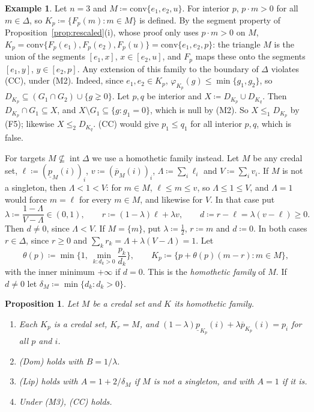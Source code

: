 \documentclass[11pt]{article}
\newtheorem{proposition}[theorem]{Proposition}
\theoremstyle{definition}
\newtheorem{example}[theorem]{Example}
\newcommand{\lp}{\underline{p}}
\newcommand{\up}{\overline{p}}
\newcommand{\gneqz}{\gneq 0}
\begin{document}
\begin{example}\label{ex:cc-fails}
Let $n=3$ and $M\coloneqq\mathrm{conv}\{e_1,e_2,u\}$. For interior $p$, $p\cdot m>0$ for all $m\in\Delta$, so $K_p\coloneqq\{F_p(m):m\in M\}$ is defined. By the segment property of Proposition~\ref{prop:rescaled}(i), whose proof only uses $p\cdot m>0$ on $M$, $K_p=\mathrm{conv}\{F_p(e_1),F_p(e_2),F_p(u)\}=\mathrm{conv}\{e_1,e_2,p\}$: the triangle $M$ is the union of the segments $[e_1,x]$, $x\in[e_2,u]$, and $F_p$ maps these onto the segments $[e_1,y]$, $y\in[e_2,p]$. Any extension of this family to the boundary of $\Delta$ violates (CC), under (M2). Indeed, since $e_1,e_2\in K_p$, $\varphi_{K_p}(g)\le\min\{g_1,g_2\}$, so $D_{K_p}\subseteq(G_1\cap G_2)\cup\{g\gneqz\}$. Let $p,q$ be interior and $X\coloneqq D_{K_p}\cup D_{K_q}$. Then $D_{K_p}\cap G_1\subseteq X$, and $X\setminus G_1\subseteq\{g:g_1=0\}$, which is null by (M2). So $X\le_1D_{K_p}$ by (F5); likewise $X\le_2D_{K_q}$. (CC) would give $p_1\le q_1$ for all interior $p,q$, which is false.
\end{example}

For targets $M\not\subseteq\operatorname{int}\Delta$ we use a homothetic family instead. Let $M$ be any credal set, $\ell\coloneqq(\lp_M(i))_i$, $v\coloneqq(\up_M(i))_i$, $\Lambda\coloneqq\sum_i\ell_i$ and $V\coloneqq\sum_iv_i$. If $M$ is not a singleton, then $\Lambda<1<V$: for $m\in M$, $\ell\le m\le v$, so $\Lambda\le1\le V$, and $\Lambda=1$ would force $m=\ell$ for every $m\in M$, and likewise for $V$. In that case put
\[
\lambda\coloneqq\frac{1-\Lambda}{V-\Lambda}\in(0,1),\qquad r\coloneqq(1-\lambda)\ell+\lambda v,\qquad d\coloneqq r-\ell=\lambda(v-\ell)\ge0 .
\]
Then $d\ne0$, since $\Lambda<V$. If $M=\{m\}$, put $\lambda\coloneqq\frac12$, $r\coloneqq m$ and $d\coloneqq0$. In both cases $r\in\Delta$, since $r\ge0$ and $\sum_kr_k=\Lambda+\lambda(V-\Lambda)=1$. Let
\[
\theta(p)\coloneqq\min\Big\{1,\ \min_{k:d_k>0}\frac{p_k}{d_k}\Big\},\qquad K_p\coloneqq\{p+\theta(p)(m-r):m\in M\},
\]
with the inner minimum $+\infty$ if $d=0$. This is the \emph{homothetic family} of $M$. If $d\ne0$ let $\delta_M\coloneqq\min\{d_k:d_k>0\}$.

\begin{proposition}\label{prop:homothetic}
Let $M$ be a credal set and $K$ its homothetic family.
\begin{enumerate}[label=(\roman*)]
\item Each $K_p$ is a credal set, $K_r=M$, and $(1-\lambda)\lp_{K_p}(i)+\lambda\up_{K_p}(i)=p_i$ for all $p$ and $i$.
\item (Dom) holds with $B=1/\lambda$.
\item (Lip) holds with $A=1+2/\delta_M$ if $M$ is not a singleton, and with $A=1$ if it is.
\item Under (M3), (CC) holds.
\end{enumerate}
\end{proposition}
\end{document}

